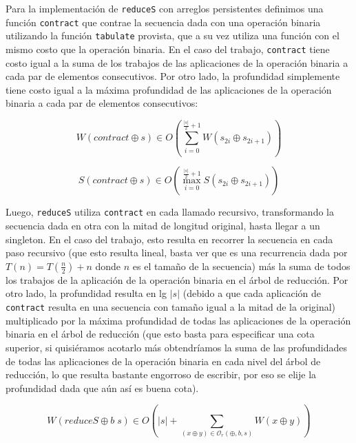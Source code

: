 \documentclass[a4paper,10pt]{article}
\begin{document}
Para la implementación de \texttt{reduceS} con arreglos persistentes definimos
una función \texttt{contract} que contrae la secuencia dada con una operación
binaria utilizando la función \texttt{tabulate} provista, que a su vez utiliza
una función con el mismo costo que la operación binaria. En el caso del trabajo,
\texttt{contract} tiene costo igual a la suma de los trabajos de las aplicaciones
de la operación binaria a cada par de elementos consecutivos. Por otro lado,
la profundidad simplemente tiene costo igual a la máxima profundidad de las
aplicaciones de la operación binaria a cada par de elementos consecutivos:

\begin{equation*}
    W \left( contract \oplus s \right) \in
    O \left( \sum_{i=0}^{\frac{\vert s \vert}{2} + 1} W \left( s_{2i} \oplus s_{2i+1} \right) \right)
\end{equation*}

\begin{equation*}
    S \left( contract \oplus s \right) \in
    O \left( \max_{i=0}^{\frac{\vert s \vert}{2} + 1} S \left( s_{2i} \oplus s_{2i+1} \right) \right)
\end{equation*}

Luego, \texttt{reduceS} utiliza \texttt{contract} en cada llamado recursivo,
transformando la secuencia dada en otra con la mitad de longitud original, hasta
llegar a un singleton. En el caso del trabajo, esto resulta en recorrer la secuencia
en cada paso recursivo (que esto resulta lineal, basta ver que es una recurrencia
dada por $T \left( n \right) = T \left( \frac{n}{2} \right) + n$ donde $n$ es el
tamaño de la secuencia) más la suma de todos los trabajos de la aplicación de la
operación binaria en el árbol de reducción. Por otro lado, la profundidad resulta
en lg $\vert s \vert$ (debido a que cada aplicación de \texttt{contract} resulta
en una secuencia con tamaño igual a la mitad de la original) multiplicado por la
máxima profundidad de todas las aplicaciones de la operación binaria en el árbol
de reducción (que esto basta para especificar una cota superior, si quisiéramos
acotarlo más obtendríamos la suma de las profundidades de todas las aplicaciones
de la operación binaria en cada nivel del árbol de reducción, lo que resulta
bastante engorroso de escribir, por eso se elije la profundidad dada que aún así
es buena cota).

\begin{equation*}
    W \left( reduceS \oplus b \; s \right) \in
    O \left( \vert s \vert + \sum_{(x \oplus y) \in \mathcal{O}_r(\oplus,b,s)} W \left( x \oplus y \right) \right)
\end{equation*}
\end{document}
